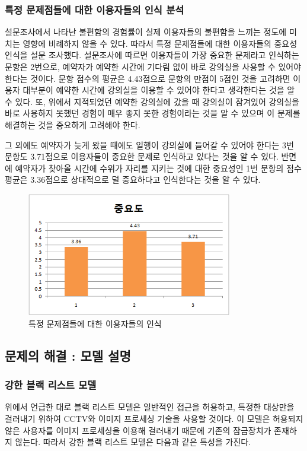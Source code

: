 \documentclass[11pt,a4paper]{article}
\begin{document}
\subsubsection{특정 문제점들에 대한 이용자들의 인식 분석}
설문조사에서 나타난 불편함의 경험률이 실제 이용자들의 불편함을 느끼는 정도에
미치는 영향에 비례하지 않을 수 있다. 따라서 특정 문제점들에 대한 이용자들의
중요성 인식을 설문 조사했다. 설문조사에 따르면 이용자들이 가장 중요한 문제라고
인식하는 문항은 2번으로, 예약자가 예약한 시간에 기다림 없이 바로 강의실을
사용할 수 있어야 한다는 것이다. 문항 점수의 평균은 4.43점으로 문항의 만점이
5점인 것을 고려하면 이용자 대부분이 예약한 시간에 강의실을 이용할 수 있어야
한다고 생각한다는 것을 알 수 있다. 또, 위에서 지적되었던 예약한 강의실에 갔을
때 강의실이 잠겨있어 강의실을 바로 사용하지 못했던 경험이 매우 좋지 못한
경험이라는 것을 알 수 있으며 이 문제를 해결하는 것을 중요하게 고려해야 한다.

그 외에도 예약자가 늦게 왔을 때에도 일행이 강의실에 들어갈 수 있어야 한다는 3번
문항도 3.71점으로 이용자들이 중요한 문제로 인식하고 있다는 것을 알 수 있다.
반면에 예약자가 찾아올 시간에 수위가 자리를 지키는 것에 대한 중요성인 1번
문항의 점수 평균은 3.36점으로 상대적으로 덜 중요하다고 인식한다는 것을 알 수
있다.
\begin{figure}[H]
\includegraphics[width=0.8\textwidth]{4_1_4}
\centering
\caption{특정 문제점들에 대한 이용자들의 인식}
\end{figure}


\subsection{문제의 해결 : 모델 설명}

\subsubsection{강한 블랙 리스트 모델}
위에서 언급한 대로 블랙 리스트 모델은 일반적인 접근을 허용하고, 특정한 대상만을
걸러내기 위하여 CCTV와 이미지 프로세싱 기술을 사용할 것이다. 이 모델은 허용되지
않은 사용자를 이미지 프로세싱을 이용해 걸러내기 때문에 기존의 잠금장치가
존재하지 않는다. 따라서 강한 블랙 리스트 모델은 다음과 같은 특성을 가진다.
\end{document}
